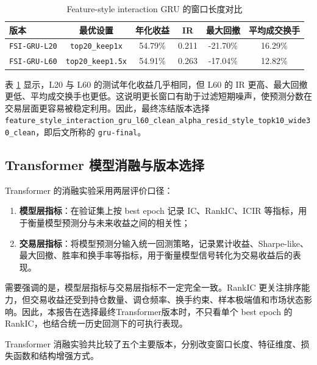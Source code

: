 \documentclass[12pt,a4paper,cn,bibtex]{elegantpaper}
\newcommand{\modelname}[1]{\nolinkurl{#1}}
\begin{document}
\begin{table}[H]
    \centering
    \small
    \setlength{\tabcolsep}{4pt}
    \begin{tabularx}{\textwidth}{Xccccc}
        \toprule
        \textbf{版本} & \textbf{最优设置} & \textbf{年化收益} & \textbf{IR} & \textbf{最大回撤} & \textbf{平均成交换手} \\
        \midrule
        \modelname{FSI-GRU-L20} & \modelname{top20\_keep1x} & 54.79\% & 0.211 & -21.70\% & 16.29\% \\
        \modelname{FSI-GRU-L60} & \modelname{top20\_keep1.5x} & 54.91\% & 0.263 & -17.04\% & 12.82\% \\
        \bottomrule
    \end{tabularx}
    \caption{Feature-style interaction GRU 的窗口长度对比}
    \label{tab:gru-fsi-window}
\end{table}

表 \ref{tab:gru-fsi-window} 显示，L20 与 L60 的测试年化收益几乎相同，但 L60 的 IR 更高、最大回撤更低、平均成交换手也更低。这说明更长窗口有助于过滤短期噪声，使预测分数在交易层面更容易被稳定利用。因此，最终冻结版本选择 \modelname{feature\_style\_interaction\_gru\_l60\_clean\_alpha\_resid\_style\_topk10\_wide30\_clean}，即后文所称的 \modelname{gru-final}。

\subsection{Transformer 模型消融与版本选择}

Transformer 的消融实验采用两层评价口径：
\begin{enumerate}[label=\arabic*)]
    \item \textbf{模型层指标}：在验证集上按 best epoch 记录 IC、RankIC、ICIR 等指标，用于衡量模型预测分与未来收益之间的相关性；
    \item \textbf{交易层指标}：将模型预测分输入统一回测策略，记录累计收益、Sharpe-like、最大回撤、胜率和换手率等指标，用于衡量模型信号转化为交易收益后的表现。
\end{enumerate}

需要强调的是，模型层指标与交易层指标不一定完全一致。RankIC 更关注排序能力，但交易收益还受到持仓数量、调仓频率、换手约束、样本极端值和市场状态影响。因此，本报告在选择最终Transformer版本时，不只看单个 best epoch 的 RankIC，也结合统一历史回测下的可执行表现。

Transformer 消融实验共比较了五个主要版本，分别改变窗口长度、特征维度、损失函数和结构增强方式。
\end{document}
